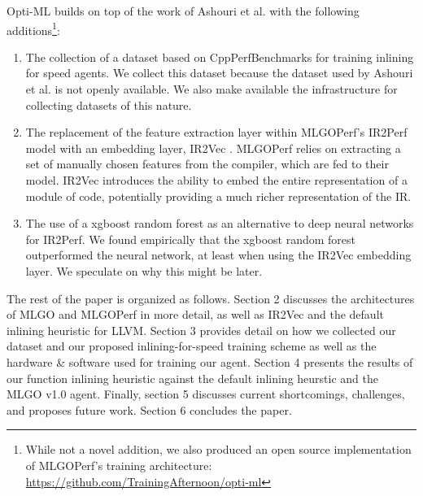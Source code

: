 \documentclass[nohyperref]{article}
\theoremstyle{plain}
\theoremstyle{definition}
\theoremstyle{remark}
\begin{document}
Opti-ML builds on top of the work of Ashouri et al. with the following additions\footnote{While not a novel addition, we also produced an open source implementation of MLGOPerf's training architecture: \href{https://github.com/TrainingAfternoon/opti-ml}{https://github.com/TrainingAfternoon/opti-ml}}:
\begin{enumerate}
    \item The collection of a dataset based on CppPerfBenchmarks \cite{cpp-perf-benchmarks} for training inlining for speed agents. We collect this dataset because the dataset used by Ashouri et al. is not openly available. We also make available the infrastructure for collecting datasets of this nature.
    \item The replacement of the feature extraction layer within MLGOPerf's IR2Perf model with an embedding layer, IR2Vec \cite{ir2vec}. MLGOPerf relies on extracting a set of manually chosen features from the compiler, which are fed to their model. IR2Vec  introduces the ability to embed the entire representation of a module of code, potentially providing a much richer representation of the IR.
    \item The use of a xgboost random forest as an alternative to deep neural networks for IR2Perf. We found empirically that the xgboost random forest outperformed the neural network, at least when using the IR2Vec embedding layer. We speculate on why this might be later.
\end{enumerate}

The rest of the paper is organized as follows. Section 2 discusses the architectures of MLGO and MLGOPerf in more detail, as well as IR2Vec and the default inlining heuristic for LLVM. Section 3 provides detail on how we collected our dataset and our proposed inlining-for-speed training scheme as well as the hardware \& software used for training our agent. Section 4 presents the results of our function inlining heuristic against the default inlining heurstic and the MLGO v1.0 agent. Finally, section 5 discusses current shortcomings, challenges, and proposes future work. Section 6 concludes the paper.
\end{document}
